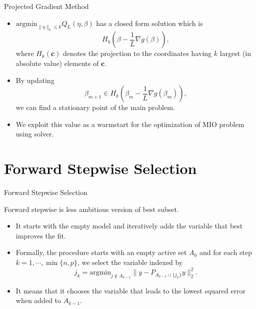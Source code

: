 \documentclass[blue, 10pt]{beamer}
\begin{document}
\begin{frame}{Projected Gradient Method}
  
  \begin{itemize}
    \item $\text{argmin}_{\|\eta\|_0\leq k} Q_L(\eta, \beta)$ has a closed form solution which is
    $$
    H_k \left(\beta-\frac{1}{L}\nabla g(\beta) \right),
    $$ where $H_k(\mathbf{c})$ denotes the projection to the coordinates having $k$ largest (in absolute value) elements of $\mathbf{c}$.
    \item By updating
    $$
    \beta_{m+1} \in H_k \left(\beta_m -\frac{1}{L}\nabla g(\beta_m) \right),
    $$
    we can find a stationary point of the main problem.
    \item We exploit this value as a warmstart for the optimization of MIO problem using solver.
  \end{itemize}

\end{frame}


\section{Forward Stepwise Selection}

\begin{frame}{Forward Stepwise Selection}

Forward stepwise is less ambitious version of best subset.
\begin{itemize}
  \item It starts with the empty model and iteratively adds the variable that best improves the fit. 
  \item Formally, the procedure starts with an empty active set $A_0$ and for each step $k=1, \cdots, \min\{n, p\}$, we select the variable indexed by $$ j_k = \text{argmin}_{j\notin A_{k-1}}\|y-P_{A_{k-1}\cup \{j_k\}} y\|_2^2.$$ 
  \item It means that it chooses the variable that leads to the lowest squared error when added to $A_{k-1}$.
\end{itemize}

\end{frame}
\end{document}
